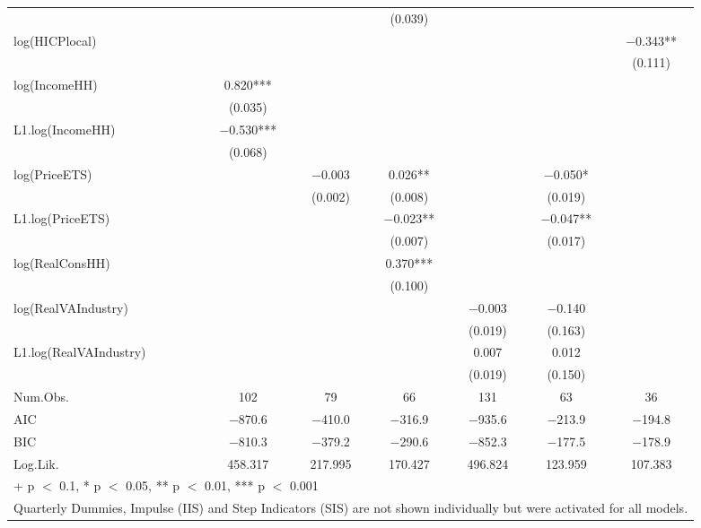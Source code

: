 \begin{table}
{\begin{tabular}[t]{lcccccc}
 &  &  & (\num{0.039}) &  &  & \\
log(HICPlocal) &  &  &  &  &  & \num{-0.343}**\\
 &  &  &  &  &  & (\num{0.111})\\
log(IncomeHH) & \num{0.820}*** &  &  &  &  & \\
 & (\num{0.035}) &  &  &  &  & \\
L1.log(IncomeHH) & \num{-0.530}*** &  &  &  &  & \\
 & (\num{0.068}) &  &  &  &  & \\
log(PriceETS) &  & \num{-0.003} & \num{0.026}** &  & \num{-0.050}* & \\
 &  & (\num{0.002}) & (\num{0.008}) &  & (\num{0.019}) & \\
L1.log(PriceETS) &  &  & \num{-0.023}** &  & \num{-0.047}** & \\
 &  &  & (\num{0.007}) &  & (\num{0.017}) & \\
log(RealConsHH) &  &  & \num{0.370}*** &  &  & \\
 &  &  & (\num{0.100}) &  &  & \\
log(RealVAIndustry) &  &  &  & \num{-0.003} & \num{-0.140} & \\
 &  &  &  & (\num{0.019}) & (\num{0.163}) & \\
L1.log(RealVAIndustry) &  &  &  & \num{0.007} & \num{0.012} & \\
 &  &  &  & (\num{0.019}) & (\num{0.150}) & \\
\midrule
Num.Obs. & \num{102} & \num{79} & \num{66} & \num{131} & \num{63} & \num{36}\\
AIC & \num{-870.6} & \num{-410.0} & \num{-316.9} & \num{-935.6} & \num{-213.9} & \num{-194.8}\\
BIC & \num{-810.3} & \num{-379.2} & \num{-290.6} & \num{-852.3} & \num{-177.5} & \num{-178.9}\\
Log.Lik. & \num{458.317} & \num{217.995} & \num{170.427} & \num{496.824} & \num{123.959} & \num{107.383}\\
\bottomrule
\multicolumn{7}{l}{\rule{0pt}{1em}+ p $<$ 0.1, * p $<$ 0.05, ** p $<$ 0.01, *** p $<$ 0.001}\\
\multicolumn{7}{l}{\rule{0pt}{1em}Quarterly Dummies, Impulse (IIS) and Step Indicators (SIS) are not shown individually but were activated for all models.}\\
\end{tabular}}
\end{table}
